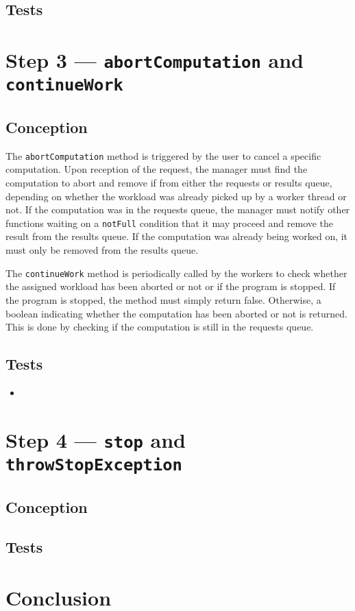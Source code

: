\documentclass{article}
\begin{document}
    \subsection*{Tests}

    \section*{Step 3 --- \texttt{abortComputation} and \texttt{continueWork}}

    \subsection*{Conception}

    The \texttt{abortComputation} method is triggered by the user to cancel a specific computation.
    Upon reception of the request, the manager must find the computation to abort and remove if from either the requests or results queue, depending
    on whether the workload was already picked up by a worker thread or not.
    If the computation was in the requests queue, the manager must notify other functions waiting on a \texttt{notFull} condition that it may proceed and remove the result from the results queue.
    If the computation was already being worked on, it must only be removed from the results queue.

    The \texttt{continueWork} method is periodically called by the workers to check whether the assigned workload has been aborted or not or if the program is stopped.
    If the program is stopped, the method must simply return false.
    Otherwise, a boolean indicating whether the computation has been aborted or not is returned.
    This is done by checking if the computation is still in the requests queue.

    \subsection*{Tests}

    \begin{itemize}
        \item
    \end{itemize}

    \section*{Step 4 --- \texttt{stop} and \texttt{throwStopException}}
    \subsection*{Conception}
    \subsection*{Tests}

    \section*{Conclusion}
\end{document}
